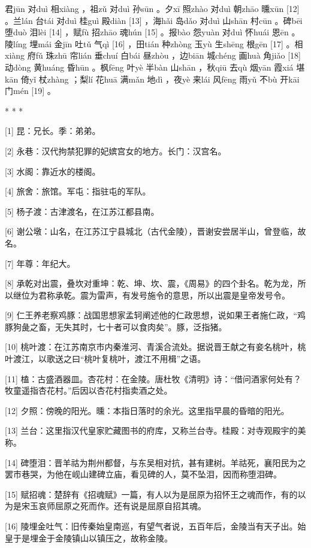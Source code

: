 \documentclass[12pt,UTF8]{ctexbook}
\begin{document}
君jūn 对duì 相xiàng ，祖zǔ 对duì 孙sūn 。夕xī 照zhào 对duì 朝zhāo 曛xūn [12] 。兰lán 台tái 对duì 桂guì 殿diàn [13] ，海hǎi 岛dǎo 对duì 山shān 村cūn 。碑bēi 堕duò 泪lèi [14] ，赋fù 招zhāo 魂hún [15] 。报bào 怨yuàn 对duì 怀huái 恩ēn 。陵líng 埋mái 金jīn 吐tǔ 气qì [16] ，田tián 种zhòng 玉yù 生shēng 根gēn [17] 。相xiàng 府fǔ 珠zhū 帘lián 垂chuí 白bái 昼zhòu ，边biān 城chéng 画huà 角jiǎo [18] 动dòng 黄huáng 昏hūn 。枫fēng 叶yè 半bàn 山shān ，秋qiū 去qù 烟yān 霞xiá 堪kān 倚yǐ 杖zhàng ；梨lí 花huā 满mǎn 地dì ，夜yè 来lái 风fēng 雨yǔ 不bù 开kāi 门mén [19] 。



* * *



[1] 昆：兄长。季：弟弟。

[2] 永巷：汉代拘禁犯罪的妃嫔宫女的地方。长门：汉宫名。

[3] 水阁：靠近水的楼阁。

[4] 旅舍：旅馆。军屯：指驻屯的军队。

[5] 杨子渡：古津渡名，在江苏江都县南。

[6] 谢公墩：山名，在江苏江宁县城北（古代金陵），晋谢安尝居半山，曾登临，故名。

[7] 年尊：年纪大。

[8] 承乾对出震，叠坎对重坤：乾、坤、坎、震，《周易》的四个卦名。乾为龙，所以继位为君称承乾。震为雷声，有发号施令的意思，所以出震是皇帝发号令。

[9] 仁王养老察鸡豚：战国思想家孟轲阐述他的仁政思想，说如果王者施仁政，“鸡豚狗彘之畜，无失其时，七十者可以食肉矣”。豚，泛指猪。

[10] 桃叶渡：在江苏南京市内秦淮河、青溪合流处。据说晋王献之有妾名桃叶，桃叶渡江，以歌送之曰“桃叶复桃叶，渡江不用楫”之语。

[11] 榼：古盛酒器皿。杏花村：在金陵。唐杜牧《清明》诗：“借问酒家何处有？牧童遥指杏花村。”后因以杏花村指卖酒之处。

[12] 夕照：傍晚的阳光。曛：本指日落时的余光。这里指早晨的昏暗的阳光。

[13] 兰台：这里指汉代皇家贮藏图书的府库，又称兰台寺。桂殿：对寺观殿宇的美称。

[14] 碑堕泪：晋羊祜为荆州都督，与东吴相对抗，甚有建树。羊祜死，襄阳民为之罢巿巷哭，为他在岘山建碑立庙，看见碑的人，莫不坠泪，因而称堕泪碑。

[15] 赋招魂：楚辞有《招魂赋》一篇，有人以为是屈原为招怀王之魂而作，有的以为是宋玉哀师屈原之死而作。还有说是屈原自招其魂。

[16] 陵埋金吐气：旧传秦始皇南巡，有望气者说，五百年后，金陵当有天子出。始皇于是埋金于金陵镇山以镇压之，故称金陵。
\end{document}
